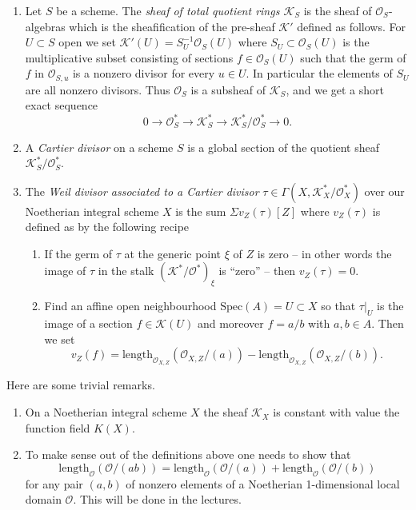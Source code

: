 \begin{definition}
\begin{enumerate}
\begin{enumerate}
\end{enumerate}
\item Let $S$ be a scheme. The {\it sheaf of total quotient
rings ${\mathcal K}_S$} is the sheaf of ${\mathcal O}_S$-algebras which is
the sheafification of the pre-sheaf ${\mathcal K}'$ defined as follows.
For $U \subset S$ open we set ${\mathcal K}'(U) = S_U^{-1}{\mathcal O}_S(U)$
where $S_U \subset {\mathcal O}_S(U)$ is the multiplicative subset
consisting of sections $f \in {\mathcal O}_S(U)$ such that the germ
of $f$ in ${\mathcal O}_{S, u}$ is a nonzero divisor for every $u\in U$.
In particular the elements of $S_U$ are all nonzero divisors.
Thus ${\mathcal O}_S$ is a subsheaf of ${\mathcal K}_S$, and we get a
short exact sequence
$$
0 \to {\mathcal O}_S^\ast \to {\mathcal K}_S^\ast \to
{\mathcal K}_S^\ast/{\mathcal O}_S^\ast \to 0.
$$
\item A {\it Cartier divisor} on a scheme $S$ is a global
section of the quotient sheaf ${\mathcal K}_S^\ast/{\mathcal O}_S^\ast$.
\item The {\it Weil divisor associated to a Cartier divisor}
$\tau \in \Gamma(X, {\mathcal K}_X^\ast/{\mathcal O}_X^\ast)$ over our
Noetherian integral scheme
$X$ is the sum $\Sigma v_Z(\tau)[Z]$ where $v_Z(\tau)$ is defined
as by the following recipe
\begin{enumerate}
\item If the germ of $\tau$ at the generic point $\xi$
of $Z$ is zero -- in other words the image of $\tau$ in the stalk
$({\mathcal K}^\ast/{\mathcal O}^\ast)_\xi$ is ``zero'' -- then $v_Z(\tau) = 0$.
\item Find an affine open neighbourhood $\text{Spec}(A) = U \subset X$
so that $\tau|_U$ is the image of a section $f \in {\mathcal K}(U)$
and moreover $f = a/b$ with $a, b \in A$. Then we set
$$
v_Z(f) = \text{length}_{{\mathcal O}_{X, Z}}({\mathcal O}_{X, Z}/(a)) -
\text{length}_{{\mathcal O}_{X, Z}}({\mathcal O}_{X, Z}/(b)).
$$
\end{enumerate}
\end{enumerate}
\end{definition}

\begin{remarks}
\label{remarks-divisors}
Here are some trivial remarks.
\begin{enumerate}
\item On a Noetherian integral scheme $X$ the
sheaf ${\mathcal K}_X$ is constant with value the function field $K(X)$.
\item To make sense out of the definitions above one needs
to show that
$$
\text{length}_{\mathcal O}({\mathcal O}/(ab)) =
\text{length}_{\mathcal O}({\mathcal O}/(a)) +
\text{length}_{\mathcal O}({\mathcal O}/(b))
$$
for any pair $(a, b)$ of nonzero elements of a Noetherian 1-dimensional
local domain ${\mathcal O}$. This will be done in the lectures.
\end{enumerate}
\end{remarks}

